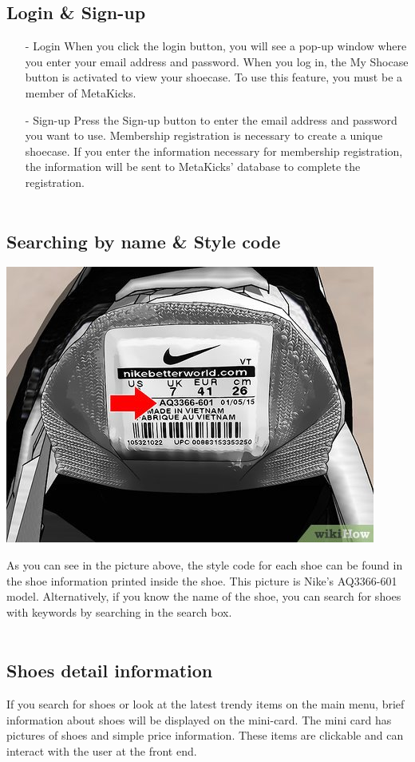 \documentclass[conference]{IEEEtran}
\begin{document}
\begin{enumerate}
\subsection{Login \& Sign-up}
\begin{enumerate}
\item[-]Login
When you click the login button, you will see a pop-up window where you enter your email address and password. When you log in, the My Shocase button is activated to view your shoecase. To use this feature, you must be a member of MetaKicks.\\
\item[-]Sign-up
Press the Sign-up button to enter the email address and password you want to use. Membership registration is necessary to create a unique shoecase. If you enter the information necessary for membership registration, the information will be sent to MetaKicks' database to complete the registration.\\\\
\end{enumerate}
\subsection{Searching by name \& Style code}
\centerline{\includegraphics[scale=2]{pics/Nike_Stylecode.jpg}}
As you can see in the picture above, the style code for each shoe can be found in the shoe information printed inside the shoe. This picture is Nike's AQ3366-601 model. Alternatively, if you know the name of the shoe, you can search for shoes with keywords by searching in the search box.\\\\
\subsection{Shoes detail information}
If you search for shoes or look at the latest trendy items on the main menu, brief information about shoes will be displayed on the mini-card. The mini card has pictures of shoes and simple price information. These items are clickable and can interact with the user at the front end.\\\\

\end{enumerate}
\end{document}
